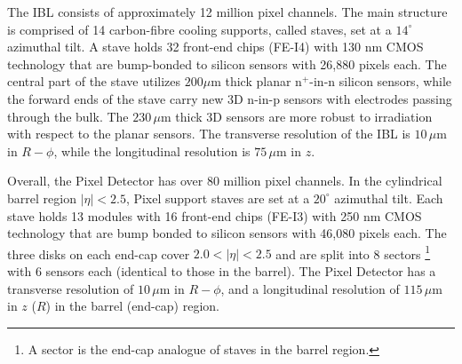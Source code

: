 The IBL consists of approximately 12 million pixel channels. The main structure is comprised of 14 carbon-fibre cooling supports, called staves, set at a $14^{\circ}$ azimuthal tilt.
A stave holds 32 front-end chips (FE-I4) with 130 nm CMOS technology that are bump-bonded
to silicon sensors with 26,880 pixels each. 
The central part of the stave utilizes $200 \mu$m thick planar n$^+$-in-n silicon sensors, while the forward ends of the stave carry new 3D n-in-p sensors with electrodes passing through the bulk. The $230\,\mu$m thick 3D sensors are more robust to irradiation with respect to the planar sensors. The transverse resolution of the IBL is $10\,\mu$m in $R-\phi$, while the longitudinal resolution is $75\,\mu$m in $z$.

Overall, the Pixel Detector has over 80 million pixel channels. In the cylindrical barrel region $|\eta|<2.5$, Pixel support staves are set at a $20^{\circ}$ azimuthal tilt.
Each stave holds 13 modules with 16 front-end chips (FE-I3) with 250 nm CMOS technology that are bump bonded to silicon sensors with 46,080 pixels each. 
The three disks on each end-cap cover $2.0< |\eta| < 2.5$ and are split into 8 sectors
\footnote{A sector is the end-cap analogue of staves in the barrel region.} 
with 6 sensors each (identical to those in the barrel). The Pixel Detector has a transverse resolution of $10\,\mu$m in $R-\phi$, and a longitudinal resolution of $115\,\mu$m in $z$ ($R$) in the barrel (end-cap) region. 

